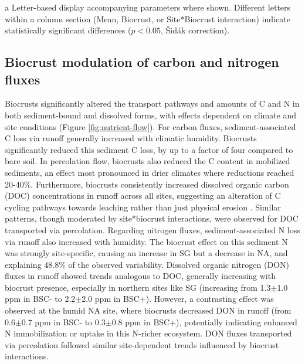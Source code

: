 \begin{table}
\begin{threeparttable}
\begin{tabular*}{\linewidth}
            \bottomrule
        \end{tabular*} %

        \begin{tablenotes}
           \item[a] Letter-based display accompanying parameters where shown. Different letters within a column section (Mean, Biocrust, or Site*Biocrust interaction) indicate statistically significant differences ($p < 0.05$, Šidák correction).
        \end{tablenotes}

    \end{threeparttable}
\end{table} %

\FloatBarrier

\FloatBarrier

\subsection{Biocrust modulation of carbon and nitrogen fluxes}
\label{sec:BiocrustOnNutrientFlows}

Biocrusts significantly altered the transport pathways and amounts of C and N in both sediment-bound and dissolved forms, with effects dependent on climate and site conditions (Figure \ref{fig:nutrient-flow}). For carbon fluxes, sediment-associated C loss via runoff generally increased with climatic humidity. Biocrusts significantly reduced this sediment C loss, by up to a factor of four compared to bare soil. In percolation flow, biocrusts also reduced the C content in mobilized sediments, an effect most pronounced in drier climates where reductions reached 20-40\%. Furthermore, biocrusts consistently increased dissolved organic carbon (DOC) concentrations in runoff across all sites, suggesting an alteration of C cycling pathways towards leaching rather than just physical erosion \citep{Baumert2021}. Similar patterns, though moderated by site*biocrust interactions, were observed for DOC transported via percolation. Regarding nitrogen fluxes, sediment-associated N loss via runoff also increased with humidity. The biocrust effect on this sediment N was strongly site-specific, causing an increase in SG but a decrease in NA, and explaining 48.8\% of the observed variability. Dissolved organic nitrogen (DON) fluxes in runoff showed trends analogous to DOC, generally increasing with biocrust presence, especially in northern sites like SG (increasing from 1.3$\pm$1.0 ppm in BSC- to 2.2$\pm$2.0 ppm in BSC+). However, a contrasting effect was observed at the humid NA site, where biocrusts decreased DON in runoff (from 0.6$\pm$0.7 ppm in BSC- to 0.3$\pm$0.8 ppm in BSC+), potentially indicating enhanced N immobilization or uptake in this N-richer ecosystem. DON fluxes transported via percolation followed similar site-dependent trends influenced by biocrust interactions.

